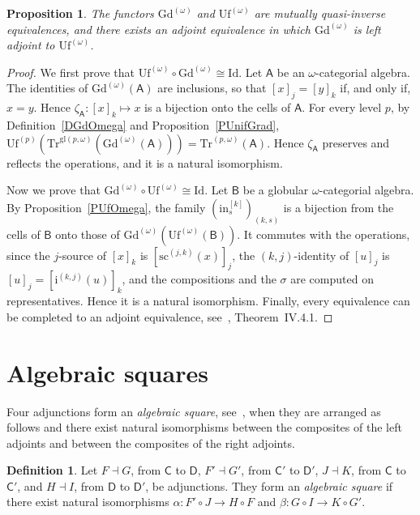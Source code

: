 \documentclass[a4paper,reqno]{amsart}
\newcommand{\calg}[1]{\boldsymbol{\mathsf{#1}}}  %
\newcommand{\Id}{\mathrm{Id}}
\newcommand{\gl}{\mathrm{gl}}
\newcommand{\src}{\mathrm{sc}}
\newcommand{\ii}{\mathrm{i}}
\newcommand{\Gd}{\mathrm{Gd}}
\newcommand{\Uf}{\mathrm{Uf}}
\newcommand{\Tr}{\mathrm{Tr}}
\newcommand{\mor}{\to}
\theoremstyle{plain}
\newtheorem{proposition}[theorem]{Proposition}
\theoremstyle{definition}
\newtheorem{definition}[theorem]{Definition}
\begin{document}
\begin{proposition}\label{POmegaGdUf}
The functors $\Gd^{(\omega)}$ and $\Uf^{(\omega)}$ are mutually quasi-inverse equivalences, and there exists an adjoint equivalence in which $\Gd^{(\omega)}$ is left adjoint to $\Uf^{(\omega)}$.
\end{proposition}
\begin{proof}
We first prove that $\Uf^{(\omega)}\circ\Gd^{(\omega)}\cong\Id$.
Let $\calg{A}$ be an $\omega$-categorial algebra.
The identities of $\Gd^{(\omega)}(\calg{A})$ are inclusions, so that $[x]_{j}=[y]_{k}$ if, and only if, $x=y$.
Hence $\zeta_{\calg{A}}\colon[x]_{k}\mapsto x$ is a bijection onto the cells of $\calg{A}$.
For every level $p$, by Definition~\ref{DGdOmega} and Proposition~\ref{PUnifGrad}, $\Uf^{(p)}(\Tr^{\gl(p,\omega)}(\Gd^{(\omega)}(\calg{A})))=\Tr^{(p,\omega)}(\calg{A})$.
Hence $\zeta_{\calg{A}}$ preserves and reflects the operations, and it is a natural isomorphism.

Now we prove that $\Gd^{(\omega)}\circ\Uf^{(\omega)}\cong\Id$.
Let $\calg{B}$ be a globular $\omega$-categorial algebra.
By Proposition~\ref{PUfOmega}, the family $(\mathrm{in}^{[k]}_{s})_{(k,s)}$ is a bijection from the cells of $\calg{B}$ onto those of $\Gd^{(\omega)}(\Uf^{(\omega)}(\calg{B}))$.
It commutes with the operations, since the $j$-source of $[x]_{k}$ is $[\src^{(j,k)}(x)]_{j}$, the $(k,j)$-identity of $[u]_{j}$ is $[u]_{j}=[\ii^{(k,j)}(u)]_{k}$, and the compositions and the $\sigma$ are computed on representatives.
Hence it is a natural isomorphism.
Finally, every equivalence can be completed to an adjoint equivalence, see~\cite{sM98}, Theorem~IV.4.1.
\end{proof}

\section{Algebraic squares}\label{SSquares}

Four adjunctions form an \emph{algebraic square}, see~\cite{CVCLRM26}, when they are arranged as follows and there exist natural isomorphisms between the composites of the left adjoints and between the composites of the right adjoints.

\begin{definition}\label{DAlgSquare}
Let $F\dashv G$, from $\mathsf{C}$ to $\mathsf{D}$, $F'\dashv G'$, from $\mathsf{C}'$ to $\mathsf{D}'$, $J\dashv K$, from $\mathsf{C}$ to $\mathsf{C}'$, and $H\dashv I$, from $\mathsf{D}$ to $\mathsf{D}'$, be adjunctions.
They form an \emph{algebraic square} if there exist natural isomorphisms $\alpha\colon F'\circ J\mor H\circ F$ and $\beta\colon G\circ I\mor K\circ G'$.
\end{definition}
\end{document}
